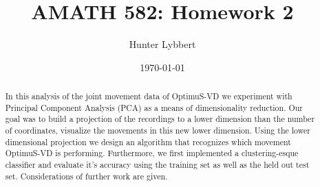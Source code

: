 \documentclass[11pt]{amsart}
\title{AMATH 582: Homework 2}
\author{Hunter Lybbert} %
\date{\today} %
\begin{document}
\maketitle

\begin{abstract}
    In this analysis of the joint movement data of OptimuS-VD we experiment with Principal Component Analysis (PCA) as a means of dimensionality reduction.
    Our goal was to build a projection of the recordings to a lower dimension than the number of coordinates, visualize the movements in this new lower dimension.
    Using the lower dimensional projection we design an algorithm that recognizes which movement OptimuS-VD is performing.
    Furthermore, we first implemented a clustering-esque classifier and evaluate it's accuracy using the training set as well as the held out test set.
    Considerations of further work are given.
\end{abstract}
\end{document}
